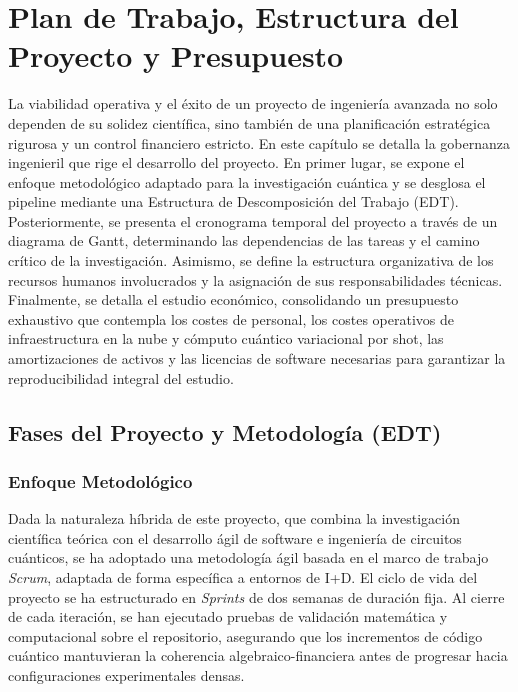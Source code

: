 \chapter{Plan de Trabajo, Estructura del Proyecto y Presupuesto}
\label{ch:plan_trabajo_presupuesto}

La viabilidad operativa y el éxito de un proyecto de ingeniería avanzada no solo dependen de su solidez científica, sino también de una planificación estratégica rigurosa y un control financiero estricto. En este capítulo se detalla la gobernanza ingenieril que rige el desarrollo del proyecto. En primer lugar, se expone el enfoque metodológico adaptado para la investigación cuántica y se desglosa el pipeline mediante una Estructura de Descomposición del Trabajo (EDT). Posteriormente, se presenta el cronograma temporal del proyecto a través de un diagrama de Gantt, determinando las dependencias de las tareas y el camino crítico de la investigación. Asimismo, se define la estructura organizativa de los recursos humanos involucrados y la asignación de sus responsabilidades técnicas. Finalmente, se detalla el estudio económico, consolidando un presupuesto exhaustivo que contempla los costes de personal, los costes operativos de infraestructura en la nube y cómputo cuántico variacional por shot, las amortizaciones de activos y las licencias de software necesarias para garantizar la reproducibilidad integral del estudio.

\section{Fases del Proyecto y Metodología (EDT)}
\label{sec:fases_proyecto_edt}

\subsection{Enfoque Metodológico}
Dada la naturaleza híbrida de este proyecto, que combina la investigación científica teórica con el desarrollo ágil de software e ingeniería de circuitos cuánticos, se ha adoptado una metodología ágil basada en el marco de trabajo \textit{Scrum}, adaptada de forma específica a entornos de I+D. El ciclo de vida del proyecto se ha estructurado en \textit{Sprints} de dos semanas de duración fija. Al cierre de cada iteración, se han ejecutado pruebas de validación matemática y computacional sobre el repositorio, asegurando que los incrementos de código cuántico mantuvieran la coherencia algebraico-financiera antes de progresar hacia configuraciones experimentales densas.

